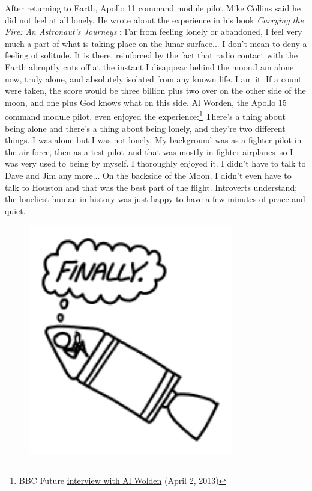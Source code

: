 {{After returning to Earth, Apollo 11 command module pilot Mike Collins said he did not feel at all lonely. He wrote about the experience in his book \emph{Carrying the Fire: An Astronaut's Journeys} :}
Far from feeling lonely or abandoned, I feel very much a part of what is taking place on the lunar surface... I don't mean to deny a feeling of solitude. It is there, reinforced by the fact that radio contact with the Earth abruptly cuts off at the instant I disappear behind the moon.I am alone now, truly alone, and absolutely isolated from any known life. I am it. If a count were taken, the score would be three billion plus two over on the other side of the moon, and one plus God knows what on this side.
{Al Worden, the Apollo 15 command module pilot, even enjoyed the experience:{\footnote{BBC Future \href{http://www.bbc.com/future/story/20130401-the-loneliest-human-being/1}{interview with Al Wolden} (April 2, 2013)} } }
There's a thing about being alone and there's a thing about being lonely, and they're two different things. I was alone but I was not lonely. My background was as a fighter pilot in the air force, then as a test pilot–and that was mostly in fighter airplanes–so I was very used to being by myself. I thoroughly enjoyed it. I didn't have to talk to Dave and Jim any more... On the backside of the Moon, I didn't even have to talk to Houston and that was the best part of the flight.
{Introverts understand; the loneliest human in history was just happy to have a few minutes of peace and quiet.}

\begin{figure}[!htbp]
\centering
\includegraphics[scale=0.5, max width=0.8\textwidth]{imgs/a/72/lonely_finally.png}
\caption{}
\end{figure}

}
